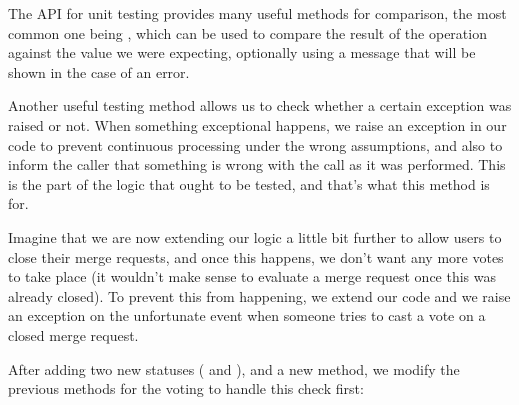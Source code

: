 \documentclass[a4paper,10pt,english]{sphinxmanual}
\begin{document}
The API for unit testing provides many useful methods for comparison, the most common
one being , which can be used to
compare the result of the operation against the value we were expecting, optionally using a
message that will be shown in the case of an error.

Another useful testing method allows us to check whether a certain exception was raised or
not. When something exceptional happens, we raise an exception in our code to prevent
continuous processing under the wrong assumptions, and also to inform the caller that
something is wrong with the call as it was performed. This is the part of the logic that ought
to be tested, and that’s what this method is for.

Imagine that we are now extending our logic a little bit further to allow users to close their
merge requests, and once this happens, we don’t want any more votes to take place (it
wouldn’t make sense to evaluate a merge request once this was already closed). To prevent
this from happening, we extend our code and we raise an exception on the unfortunate
event when someone tries to cast a vote on a closed merge request.

After adding two new statuses ( and ), and a new  method, we
modify the previous methods for the voting to handle this check first:
\end{document}
